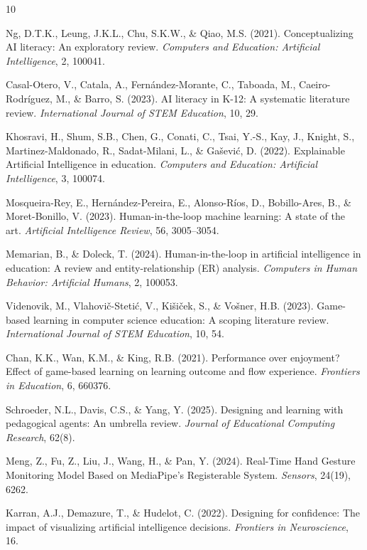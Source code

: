 \documentclass[10pt,twoside,openright]{report}
\begin{document}
\begin{thebibliography}{10}

Ng, D.T.K., Leung, J.K.L., Chu, S.K.W., \& Qiao, M.S. (2021). Conceptualizing AI literacy: An exploratory review. \textit{Computers and Education: Artificial Intelligence}, 2, 100041.

Casal-Otero, V., Catala, A., Fern\'andez-Morante, C., Taboada, M., Caeiro-Rodr\'iguez, M., \& Barro, S. (2023). AI literacy in K-12: A systematic literature review. \textit{International Journal of STEM Education}, 10, 29.

Khosravi, H., Shum, S.B., Chen, G., Conati, C., Tsai, Y.-S., Kay, J., Knight, S., Martinez-Maldonado, R., Sadat-Milani, L., \& Ga\v{s}evi\'c, D. (2022). Explainable Artificial Intelligence in education. \textit{Computers and Education: Artificial Intelligence}, 3, 100074.

Mosqueira-Rey, E., Hern\'andez-Pereira, E., Alonso-R\'ios, D., Bobillo-Ares, B., \& Moret-Bonillo, V. (2023). Human-in-the-loop machine learning: A state of the art. \textit{Artificial Intelligence Review}, 56, 3005--3054.

Memarian, B., \& Doleck, T. (2024). Human-in-the-loop in artificial intelligence in education: A review and entity-relationship (ER) analysis. \textit{Computers in Human Behavior: Artificial Humans}, 2, 100053.

Videnovik, M., Vlahovi\v{c}-Steti\'c, V., Kišiček, S., \& Vošner, H.B. (2023). Game-based learning in computer science education: A scoping literature review. \textit{International Journal of STEM Education}, 10, 54.

Chan, K.K., Wan, K.M., \& King, R.B. (2021). Performance over enjoyment? Effect of game-based learning on learning outcome and flow experience. \textit{Frontiers in Education}, 6, 660376.

Schroeder, N.L., Davis, C.S., \& Yang, Y. (2025). Designing and learning with pedagogical agents: An umbrella review. \textit{Journal of Educational Computing Research}, 62(8).

Meng, Z., Fu, Z., Liu, J., Wang, H., \& Pan, Y. (2024). Real-Time Hand Gesture Monitoring Model Based on MediaPipe's Registerable System. \textit{Sensors}, 24(19), 6262.

Karran, A.J., Demazure, T., \& Hudelot, C. (2022). Designing for confidence: The impact of visualizing artificial intelligence decisions. \textit{Frontiers in Neuroscience}, 16.

\end{thebibliography}
\end{document}
